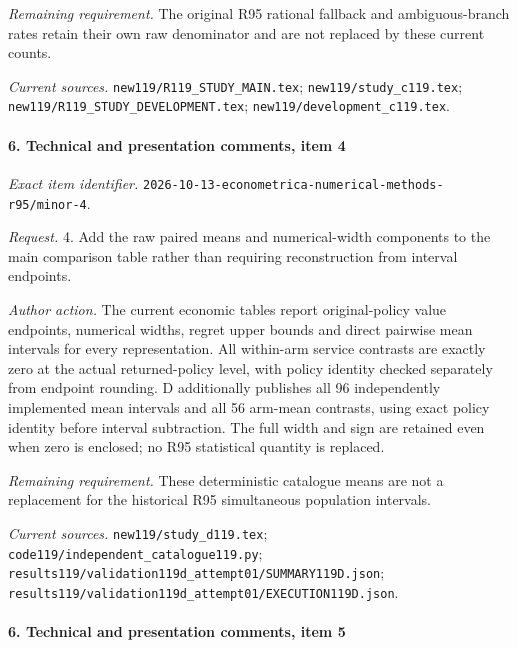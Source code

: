 \par\emph{Remaining requirement.} The original R95 rational fallback and ambiguous-branch rates retain their own raw denominator and are not replaced by these current counts.

\par\emph{Current sources.} \nolinkurl{new119/R119_STUDY_MAIN.tex}; \nolinkurl{new119/study_c119.tex}; \nolinkurl{new119/R119_STUDY_DEVELOPMENT.tex}; \nolinkurl{new119/development_c119.tex}.

\paragraph{6. Technical and presentation comments, item 4}

\emph{Exact item identifier.} \nolinkurl{2026-10-13-econometrica-numerical-methods-r95/minor-4}.

\par\emph{Request.} 4. Add the raw paired means and numerical-width components to the main comparison table rather than requiring reconstruction from interval endpoints.

\par\emph{Author action.} The current economic tables report original-policy value endpoints, numerical widths, regret upper bounds and direct pairwise mean intervals for every representation. All within-arm service contrasts are exactly zero at the actual returned-policy level, with policy identity checked separately from endpoint rounding. D additionally publishes all 96 independently implemented mean intervals and all 56 arm-mean contrasts, using exact policy identity before interval subtraction. The full width and sign are retained even when zero is enclosed; no R95 statistical quantity is replaced.

\par\emph{Remaining requirement.} These deterministic catalogue means are not a replacement for the historical R95 simultaneous population intervals.

\par\emph{Current sources.} \nolinkurl{new119/study_d119.tex}; \nolinkurl{code119/independent_catalogue119.py}; \nolinkurl{results119/validation119d_attempt01/SUMMARY119D.json}; \nolinkurl{results119/validation119d_attempt01/EXECUTION119D.json}.

\paragraph{6. Technical and presentation comments, item 5}

